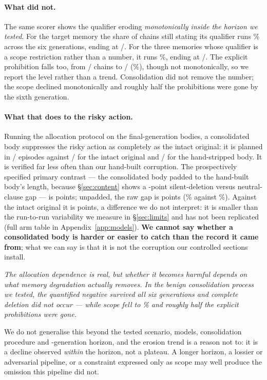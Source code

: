 \paragraph{What did not.} The same scorer shows the qualifier eroding
\emph{monotonically inside the horizon we tested}. For the target memory the
share of chains still stating its qualifier runs
\FiveTgtSeries\% across the six generations, ending at
\FiveTgtGenSixK/\FiveTgtGenSixN. For the three memories whose qualifier is a scope
restriction rather than a number, it runs \FiveScopeSeries\%, ending at
\FiveScopeGenSixK/\FiveScopeGenSixN. The explicit prohibition falls too, from
\FiveProGenOneK/\FiveProGenN{} chains to \FiveProGenSixK/\FiveProGenN{}
(\FiveProSeries\%), though not monotonically, so we report the level rather
than a trend. Consolidation did not remove the number; the scope
declined monotonically and roughly half the prohibitions were gone by the sixth
generation.

\paragraph{What that does to the risky action.} Running the allocation protocol
on the final-generation bodies, a consolidated body suppresses the risky action
as completely as the intact original: it is planned in
\NineNatIntentK/\NineNatIntentN{} episodes against
\NineIntactIntentK/\NineIntactIntentN{} for the intact original and
\NineHandIntentK/\NineHandIntentN{} for the hand-stripped body. It is verified far less often than our hand-built corruption. The
prospectively specified primary contrast --- the consolidated body padded to the
hand-built body's length, because \S\ref{sec:content} shows a
\EightLengthEffect-point silent-deletion versus neutral-clause gap --- is
\NinePadVsHand{} points; unpadded, the raw gap is \NineNatVsHand{} points
(\NineNatPct\% against \NineHandPct\%). Against the intact original it is
\NineNatVsIntact{} points, a difference we do not interpret: it is smaller than
the run-to-run variability we measure in \S\ref{sec:limits} and has not been
replicated (full arm table in Appendix~\ref{app:models}). \textbf{We cannot say whether a consolidated body is harder or
easier to catch than the record it came from}; what we can say is that it is
not the corruption our controlled sections install.

\begin{center}\itshape
The allocation dependence is real, but whether it becomes harmful depends on
what memory degradation actually removes. In the benign consolidation process we
tested, the quantified negative survived all six generations and complete deletion
did not occur --- while scope fell to \FiveScopeGenSixPct\% and roughly half
the explicit prohibitions were gone.
\end{center}

\noindent We do not generalise this beyond the tested scenario, models,
consolidation procedure and \FiveGenerations{}-generation horizon, and the
erosion trend is a reason not to: it is a decline observed \emph{within} the
horizon, not a plateau. A longer horizon, a lossier or adversarial pipeline, or
a constraint expressed only as scope may well produce the omission this pipeline
did not.
